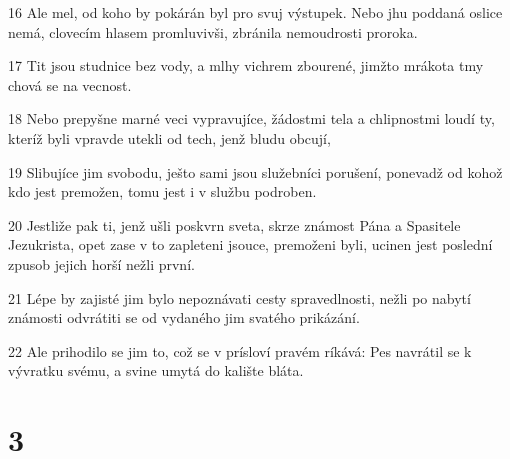 \par 16 Ale mel, od koho by pokárán byl pro svuj výstupek. Nebo jhu poddaná oslice nemá, clovecím hlasem promluvivši, zbránila nemoudrosti proroka.
\par 17 Tit jsou studnice bez vody, a mlhy vichrem zbourené, jimžto mrákota tmy chová se na vecnost.
\par 18 Nebo prepyšne marné veci vypravujíce, žádostmi tela a chlipnostmi loudí ty, kteríž byli vpravde utekli od tech, jenž bludu obcují,
\par 19 Slibujíce jim svobodu, ješto sami jsou služebníci porušení, ponevadž od kohož kdo jest premožen, tomu jest i v službu podroben.
\par 20 Jestliže pak ti, jenž ušli poskvrn sveta, skrze známost Pána a Spasitele Jezukrista, opet zase v to zapleteni jsouce, premoženi byli, ucinen jest poslední zpusob jejich horší nežli první.
\par 21 Lépe by zajisté jim bylo nepoznávati cesty spravedlnosti, nežli po nabytí známosti odvrátiti se od vydaného jim svatého prikázání.
\par 22 Ale prihodilo se jim to, což se v prísloví pravém ríkává: Pes navrátil se k vývratku svému, a svine umytá do kalište bláta.

\chapter{3}

